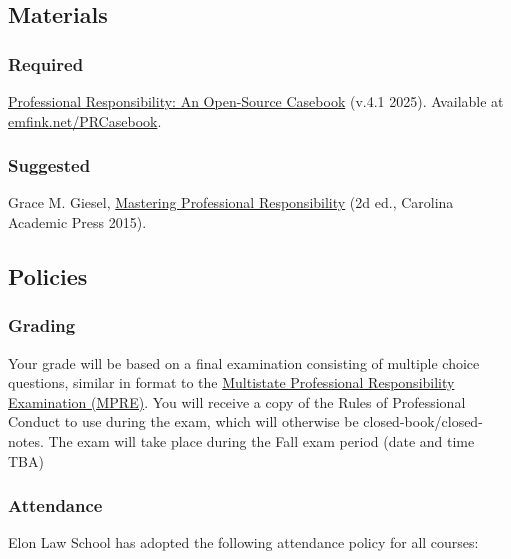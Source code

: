 \documentclass[11pt,letterpaper,twoside]{article}
\begin{document}
\subsection{Materials}\label{materials}

\subsubsection{Required}\label{required}

\href{https://emfink.net/PRCasebook}{Professional Responsibility: An
Open-Source Casebook} (v.4.1 2025). Available at
\href{https://www.emfink.net/PRCasebook/}{emfink.net/PRCasebook}.

\subsubsection{Suggested}\label{suggested}

Grace M. Giesel,
\href{https://cap-press.com/books/isbn/9781611636208/Mastering-Professional-Responsibility-Second-Edition}{Mastering
Professional Responsibility} (2d ed., Carolina Academic Press 2015).

\subsection{Policies}\label{policies}

\subsubsection{Grading}\label{grading}

Your grade will be based on a final examination consisting of multiple
choice questions, similar in format to the
\href{https://www.ncbex.org/exams/mpre}{Multistate Professional
Responsibility Examination (MPRE)}. You will receive a copy of the Rules
of Professional Conduct to use during the exam, which will otherwise be
closed-book/closed-notes. The exam will take place during the Fall exam
period (date and time TBA)

\subsubsection{Attendance}\label{attendance}

Elon Law School has adopted the following attendance policy for all
courses:
\end{document}
